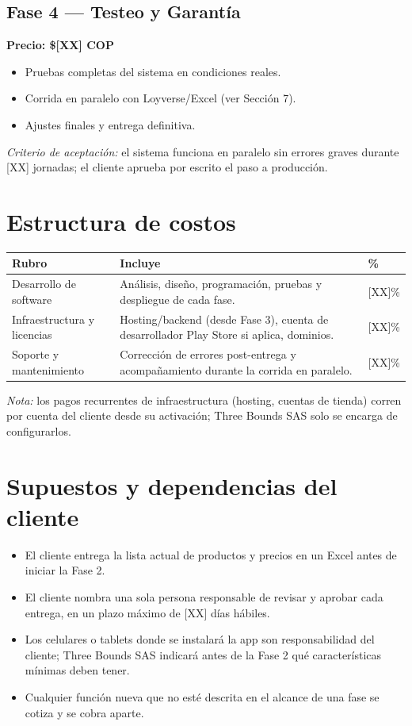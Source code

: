 \documentclass[11pt,a4paper]{article}
\begin{document}
\subsection*{Fase 4 --- Testeo y Garantía}
\textbf{Precio: \$[XX] COP}
\begin{itemize}
    \item Pruebas completas del sistema en condiciones reales.
    \item Corrida en paralelo con Loyverse/Excel (ver Sección 7).
    \item Ajustes finales y entrega definitiva.
\end{itemize}
\textit{Criterio de aceptación:} el sistema funciona en paralelo sin errores graves durante [XX] jornadas; el cliente aprueba por escrito el paso a producción.

\section{Estructura de costos}

\begin{longtable}{p{4cm}p{9cm}p{2cm}}
\toprule
\textbf{Rubro} & \textbf{Incluye} & \textbf{\%} \\
\midrule
\endhead
Desarrollo de software & Análisis, diseño, programación, pruebas y despliegue de cada fase. & [XX]\% \\
Infraestructura y licencias & Hosting/backend (desde Fase 3), cuenta de desarrollador Play Store si aplica, dominios. & [XX]\% \\
Soporte y mantenimiento & Corrección de errores post-entrega y acompañamiento durante la corrida en paralelo. & [XX]\% \\
\bottomrule
\end{longtable}

\textit{Nota:} los pagos recurrentes de infraestructura (hosting, cuentas de tienda) corren por cuenta del cliente desde su activación; Three Bounds SAS solo se encarga de configurarlos.

\section{Supuestos y dependencias del cliente}
\begin{itemize}
    \item El cliente entrega la lista actual de productos y precios en un Excel antes de iniciar la Fase 2.
    \item El cliente nombra una sola persona responsable de revisar y aprobar cada entrega, en un plazo máximo de [XX] días hábiles.
    \item Los celulares o tablets donde se instalará la app son responsabilidad del cliente; Three Bounds SAS indicará antes de la Fase 2 qué características mínimas deben tener.
    \item Cualquier función nueva que no esté descrita en el alcance de una fase se cotiza y se cobra aparte.
\end{itemize}
\end{document}
